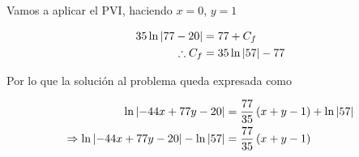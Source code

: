 \begin{enumerate}
Vamos a aplicar el PVI, haciendo $x=0$, $y=1$

\begin{align*}
    35\ln\left| 77-20 \right|&=77+C_f\\
   \therefore C_f &= 35\ln\left| 57 \right|-77
\end{align*}

Por lo que la solución al problema queda expresada como 

\begin{align*}
    \ln\left| -44x+77y-20 \right|&=\dfrac{77}{35}\left( x+y-1 \right)+\ln\left| 57 \right| \\
    \Rightarrow \ln\left| -44x+77y-20 \right|-\ln\left| 57 \right|&=\dfrac{77}{35}\left( x+y-1 \right)
\end{align*}

\begin{center}
\end{center}



\end{enumerate}
